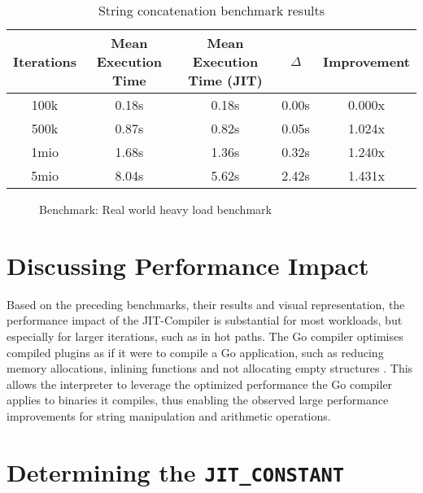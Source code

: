 \begin{table}[H]
    \centering
    \begin{tabular}{c|c|c|c|c}
        Iterations & Mean Execution Time & Mean Execution Time (JIT) & $\Delta$ & Improvement \\ 
        \hline
        100k & 0.18s & 0.18s & 0.00s & 0.000x \\
        500k & 0.87s & 0.82s & 0.05s & 1.024x \\
        1mio & 1.68s & 1.36s & 0.32s & 1.240x \\
        5mio & 8.04s & 5.62s & 2.42s & 1.431x\\
    \end{tabular}
    \label{table:benchmark-realworld}
    \caption{String concatenation benchmark results}
\end{table}

\begin{figure}[H]
    \centering
    \caption{Benchmark: Real world heavy load benchmark}
    \label{chart:benchmark-realworld}
\end{figure}

\section{Discussing Performance Impact}

Based on the preceding benchmarks, their results and visual representation, the
performance impact of the JIT-Compiler is substantial for most workloads, but
especially for larger iterations, such as in hot paths. The Go compiler
optimises compiled plugins as if it were to compile a Go application, such as
reducing memory allocations\cite[Escape Analysis]{go_wiki_optimization},
inlining functions\cite[Inlining]{go_wiki_optimization} and not allocating
empty structures \cite[Interface Values]{go_wiki_optimization}. This allows the
interpreter to leverage the optimized performance the Go compiler applies to
binaries it compiles, thus enabling the observed large performance improvements
for string manipulation and arithmetic operations.

\section{Determining the \texttt{JIT\_CONSTANT}}
\label{sec:jit-constant-discussion}
